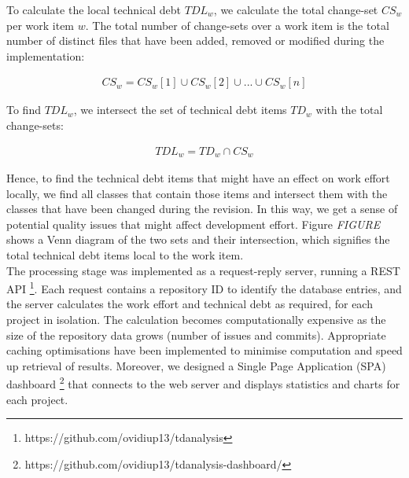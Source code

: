 \documentclass{mpaper}
\begin{document}
To calculate the local technical debt $TDL_{w}$, we calculate the total
change-set $CS_{w}$ per work item $w$. The total number of change-sets over a
work item is the total number of distinct files that have been added, removed or
modified during the implementation:

\begin{equation}
  \label{eq-td-changes}
  \begin{aligned}
    CS_{w} = CS_{w}[1] \cup CS_{w}[2] \cup ... \cup CS_{w}[n]
  \end{aligned}
\end{equation}

To find $TDL_{w}$, we intersect the set of technical debt items $TD_{w}$ with
the total change-sets:

\begin{equation}
  \label{eq-td-local}
  \begin{aligned}
    TDL_{w} = TD_{w} \cap CS_{w}
  \end{aligned}
\end{equation}

Hence, to find the technical debt items that might have an effect on work effort
locally, we find all classes that contain those items and intersect them with
the classes that have been changed during the revision. In this way, we get a
sense of potential quality issues that might affect development effort. Figure
\emph{FIGURE} shows a Venn diagram of the two sets and their intersection, which
signifies the total technical debt items local to the work item.\\

The processing stage was implemented as a request-reply server, running a REST
API \footnote{https://github.com/ovidiup13/tdanalysis}. Each request contains a
repository ID to identify the database entries, and the server calculates the
work effort and technical debt as required, for each project in isolation. The
calculation becomes computationally expensive as the size of the repository data
grows (number of issues and commits). Appropriate caching optimisations have
been implemented to minimise computation and speed up retrieval of results.
Moreover, we designed a Single Page Application (SPA) dashboard
\footnote{https://github.com/ovidiup13/tdanalysis-dashboard/} that connects to
the web server and displays statistics and charts for each project.


\end{document}
